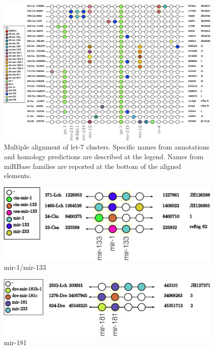 \documentclass[graybox]{svmult}
\begin{document}
\begin{figure}[ht!]
\sidecaption[t]
\includegraphics[width=\textwidth]{./Images/Cluster_images/let-7_101_128}
\caption{Multiple alignment of let-7 clusters. Specific names from annotations 
and homology predictions are described at the legend. Names from miRBase 
families are reported at the bottom of the aligned elements.} 
\label{fig:let-7}
\end{figure}

\begin{figure}[ht!]
\sidecaption[t]
\includegraphics[width=\textwidth]{./Images/Cluster_images/mir-133_113_33}
\caption{mir-1/mir-133}
\label{fig:mir-1}
\end{figure}

\begin{figure}[ht!]
\sidecaption[t]
\includegraphics[width=\textwidth]{./Images/Cluster_images/mir-181_105_2502}
\caption{mir-181}
\label{fig:mir-1}
\end{figure}
\end{document}
